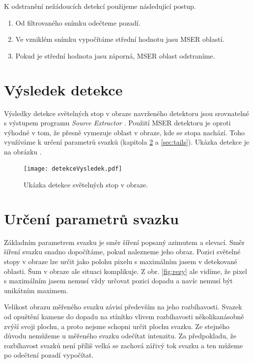K odstranění nežádoucích detekcí použijeme následující postup. 

\begin{enumerate}
\item Od filtrovaného snímku odečteme pozadí.

\item Ve vzniklém snímku vypočítáme střední hodnotu jasu MSER oblastí. 

\item Pokud je střední hodnota jasu záporná, MSER oblast odstraníme.  
\end{enumerate}

\section{Výsledek detekce}
Výsledky detekce světelných stop v obraze navrženého detektoru jsou srovnatelné s výstupem programu \textit{Source Extractor} \cite{SEXarticle}. Použití MSER detektoru je oproti \cite{SEXarticle} výhodné v tom, že přesně vymezuje oblast v obraze, kde se stopa nachází. Toho využíváme k určení parametrů svazků (kapitola \ref{sec:beam parameters} a \ref{sec:tails}). Ukázka detekce je na obrázku .

\begin{figure}[h!]
\centering
\texttt{[image: detekceVysledek.pdf]}
\caption[Ukázka detekce světelných stop v obraze.]{Ukázka detekce světelných stop v obraze. }
\label{fig: podstavec}
\end{figure}

 	      

\section{Určení parametrů svazku}
\label{sec:beam parameters}
Základním parametrem svazku je směr šíření popsaný azimutem a elevací. Směr šíření svazku snadno dopočítáme, pokud nalezneme jeho obraz. Pozici světelné stopy v obraze lze určit jako polohu pixelu s maximálním jasem v detekované oblasti. Šum v obraze ale situaci komplikuje. Z obr. \ref{fig:rezy} ale vidíme, že pixel s maximálním jasem nemusí vždy určovat pozici dopadu a navíc nemusí být unikátním maximem.

Velikost obrazu měřeného svazku závisí především na jeho rozbíhavosti. Svazek od opuštění kamene do dopadu na stínítko vlivem rozbíhavosti několikanásobně zvýší svoji plochu, a proto nejsme schopni určit plochu svazku. Ze stejného důvodu nemůžeme u měřeného svazku odečítat intenzitu. Za předpokladu, že rozbíhavost svazků není příliš velká se zachová zářivý tok svazku a ten můžeme po odečtení pozadí vypočítat. %

